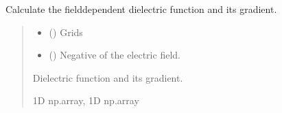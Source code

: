 \documentclass[letterpaper,10pt,english]{sphinxmanual}
\begin{document}
\begin{fulllineitems}
\label{\detokenize{fcdft.jellium:fcdft.jellium.jellium.eps_s}}
\pysigstartsignatures
\pysiglinewithargsret
{}
{\sphinxparamcomma {}}
{}
\pysigstopsignatures
\sphinxAtStartPar
Calculate the field\sphinxhyphen{}dependent dielectric function and its gradient.
\begin{quote}\begin{description}
\begin{itemize}
\item {} 
\sphinxAtStartPar
{} () \textendash{} Grids

\item {} 
\sphinxAtStartPar
{} () \textendash{} Negative of the electric field.

\end{itemize}

\sphinxAtStartPar
Dielectric function and its gradient.

\sphinxAtStartPar
1D np.array, 1D np.array

\end{description}\end{quote}

\end{fulllineitems}

\end{document}
